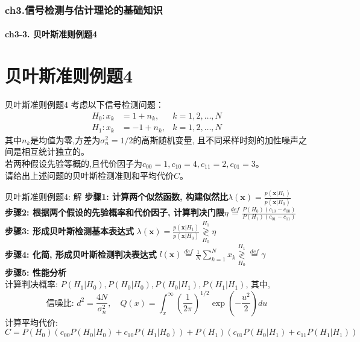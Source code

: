 \begin{frame}[shrink]
  \frametitle{ch3.信号检测与估计理论的基础知识}
  \framesubtitle{ch3-3. 贝叶斯准则例题4}
  \tableofcontents[hideallsubsections]
\end{frame}

\section{贝叶斯准则例题4}

\begin{frame}{贝叶斯准则例题4}
考虑以下信号检测问题：
\begin{align*}
H_0: x_k&=1+n_{k},   & k=1,2,\dots,N\\
H_1: x_k&=-1+n_{k}, & k=1,2,\dots,N
\end{align*}
其中$n_{k}$是均值为零,方差为$\sigma_n^2=1/2$的高斯随机变量,  且不同采样时刻的加性噪声之间是相互统计独立的。\\
若两种假设先验等概的,且代价因子为$c_{00}=1, c_{10}=4, c_{11}=2, c_{01}=3$。\\
请给出上述问题的贝叶斯检测准则和平均代价$C$。
\end{frame}

\begin{frame}[shrink]{贝叶斯准则例题4: 解}
\textbf{步骤1: 计算两个似然函数, 构建似然比}$\lambda(\bm{x})=\frac{p(\bm{x}|H_1)}{p(\bm{x}|H_0)}$\\
\textbf{步骤2: 根据两个假设的先验概率和代价因子, 计算判决门限}$\eta\mathop{=}\limits^{def}\frac{P(H_0)(c_{10}-c_{00})}{P(H_1)(c_{01}-c_{11})}$\\
\textbf{步骤3: 形成贝叶斯检测基本表达式}
$\lambda(\bm{x})=\frac{p(\bm{x}|H_1)}{p(\bm{x}|H_0)}\mathop{\gtrless}\limits_{H_0}^{H_1}\eta$\\
\textbf{步骤4: 化简, 形成贝叶斯检测判决表达式}
$l(\bm{x})\mathop{=}\limits^{def}\frac{1}{N}\sum\limits_{k=1}^{N}x_k\mathop{\gtrless}\limits_{H_0}^{H_1}\mathop{=}\limits^{def}\gamma$\\
\textbf{步骤5: 性能分析}\\
计算判决概率: $P(H_1|H_0),P(H_0|H_0),P(H_0|H_1),P(H_1|H_1)$, 其中,\\
\[\text{信噪比: }d^2=\frac{4N}{\sigma_n^2},\quad Q(x)=\int_{x}^{\infty}\left(\frac{1}{2\pi}\right)^{1/2}\exp\left(-\frac{u^2}{2}\right)du\]
计算平均代价:\\
$C=P(H_0)(c_{00}P(H_0|H_0)+c_{10}P(H_1|H_0))+P(H_1)(c_{01}P(H_0|H_1)+c_{11}P(H_1|H_1))$
\end{frame}


